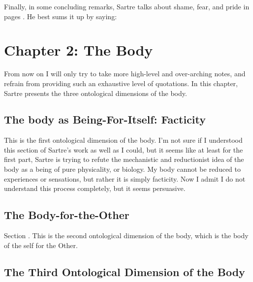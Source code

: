 \noindent
Finally, in some concluding remarks, Sartre talks about shame, fear, and pride in pages \autocite[392 -- 395]{sartre}. He best sums it up by saying: 

\section{Chapter 2: The Body}
From now on I will only try to take more high-level and over-arching notes, and refrain from providing such an exhaustive level of quotations. In this chapter, Sartre presents the three ontological dimensions of the body.

\subsection{The body as Being-For-Itself: Facticity}

This is the first ontological dimension of the body. I'm not sure if I understood this section \autocite[409 -- 453]{sartre} of Sartre's work as well as I could, but it seems like at least for the first part, Sartre is trying to refute the mechanistic and reductionist idea of the body as a being of pure physicality, or biology. My body cannot be reduced to experiences or sensations, but rather it is simply facticity. Now I admit I do not understand this process completely, but it seems persuasive.

\subsection{The Body-for-the-Other}

Section \autocite[453 -- 468]{sartre}. This is the second ontological dimension of the body, which is the body of the self for the Other.

\subsection{The Third Ontological Dimension of the Body}

